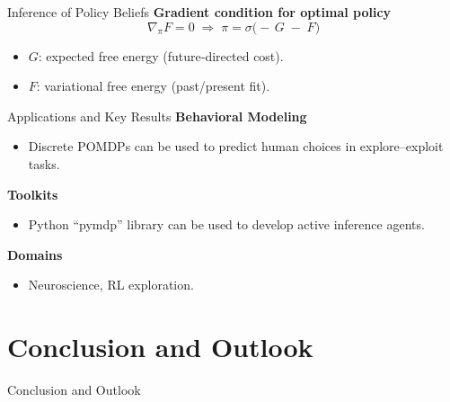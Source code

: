 \documentclass[aspectratio=1610, english]{beamer}
\begin{document}
\begin{frame}{Inference of Policy Beliefs}
    \textbf{Gradient condition for optimal policy}
    \[
      \nabla_{\pi}F = 0
      \;\Longrightarrow\;
      \pi 
      = \sigma\bigl(-\,G \;-\; F\bigr)
    \]
    \begin{itemize}
      \item \(G\): expected free energy (future‑directed cost).
      \item \(F\): variational free energy (past/present fit). 
    \end{itemize}
    \centering
    \vspace{1em}
\end{frame}

\begin{frame}{Applications and Key Results}
    \textbf{Behavioral Modeling}  
    \begin{itemize}
      \item Discrete POMDPs can be used to predict human choices in explore–exploit tasks.
    \end{itemize}
    \textbf{Toolkits}  
    \begin{itemize}
      \item Python “pymdp” library can be used to develop active inference agents.
    \end{itemize}
    \textbf{Domains}  
    \begin{itemize}
      \item Neuroscience, RL exploration.
    \end{itemize}
\end{frame}

\section{Conclusion and Outlook}
\begin{frame}{Conclusion and Outlook}
    \sectionpage
\end{frame}
\end{document}
